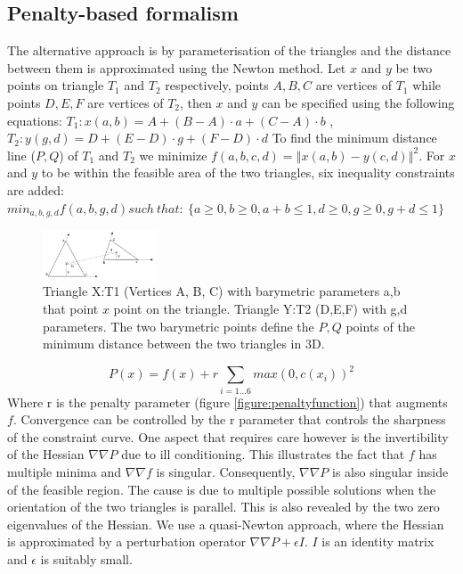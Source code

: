 \clearpage

\subsection{Penalty-based formalism}

The alternative approach is by parameterisation of the triangles and the distance between them is approximated using the Newton method. Let $x$ and $y$ be two points on triangle $T_1$ and $T_2$ respectively, points $A, B, C$ are vertices of $T_1$ while points $D, E, F$ are vertices of $T_2$, then $x$ and $y$ can be specified using the following equations: $T_{1}:x(a,b)=A+(B-A) \cdot a+(C-A)\cdot b$
, $T_{2}:y(g,d)=D+(E-D) \cdot g+(F-D) \cdot d$ To find the minimum distance line ($P,Q$) of $T_1$ and $T_2$ we minimize $f\left(a,b,c,d\right)=\left\Vert x\left(a,b\right)-y\left(c,d\right)\right\Vert ^{2}$. For $x$ and $y$ to be within the feasible area of the two triangles, six inequality constraints are added:$min_{a,b,g,d} f(a,b,g,d) such \:that: \: \{a\geq0,b\geq0, a+b\leq1, d\geq0, g\geq0, g+d\leq1 \}$

\begin{figure}[htb]
  \begin{center}
    \includegraphics[width=0.3\textwidth]{sketches/c.png}
  \end{center}
  \caption{
    Triangle X:T1 (Vertices A, B, C) with barymetric parameters a,b that point $x$ point on the triangle. Triangle Y:T2 (D,E,F) with g,d parameters. The two barymetric points define the $P,Q$ points of the minimum distance between the two triangles in 3D.
  }
  \label{figure:barycentric_contact}
\end{figure}

\begin{equation}\label{eq:penalty}
P(x)=f(x)+r\sum_{i=1...6}max(0,c(x_{i}))^{2}
\end{equation}
Where r is the penalty parameter (figure \ref{figure:penaltyfunction}) that augments $f$. Convergence can be controlled by the r parameter that controls the sharpness of the constraint curve. One aspect that requires care however is the invertibility of the Hessian $\nabla\nabla P$ due to ill conditioning. This illustrates the fact that $f$ has multiple minima and $\nabla\nabla f$ is singular. Consequently, $\nabla\nabla P$ is also singular inside of the feasible region. The cause is due to multiple possible solutions when the orientation of the two triangles is parallel. This is also revealed by the two zero eigenvalues of the Hessian. We use a quasi-Newton approach, where the Hessian is approximated by a perturbation operator $\nabla\nabla P + \epsilon I$. $I$ is an identity matrix and $\epsilon$ is suitably small.

